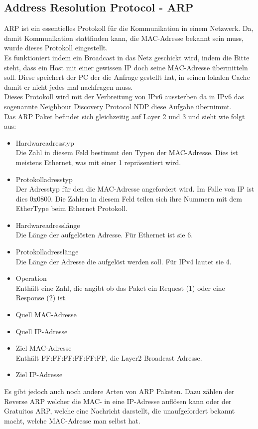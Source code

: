 \documentclass[11pt,a4paper]{report}
\begin{document}
\subsection{Address Resolution Protocol - ARP}\label{ssec:arp}
ARP ist ein essentielles Protokoll für die Kommunikation in einem Netzwerk. Da, damit Kommunikation stattfinden kann, die MAC-Adresse bekannt sein muss, wurde dieses Protokoll eingestellt.\\
Es funktioniert indem ein Broadcast in das Netz geschickt wird, indem die Bitte steht, dass ein Host mit einer gewissen IP doch seine MAC-Adresse übermitteln soll. Diese speichert der PC der die Anfrage gestellt hat, in seinen lokalen Cache damit er nicht jedes mal nachfragen muss.\\
Dieses Protokoll wird mit der Verbreitung von IPv6 aussterben da in IPv6 das sogenannte Neighbour Discovery Protocol NDP diese Aufgabe übernimmt.\\

Das ARP Paket befindet sich gleichzeitig auf Layer 2 und 3 und sieht wie folgt aus:\\
\begin{itemize}
\item Hardwareadresstyp\\
Die Zahl in diesem Feld bestimmt den Typen der MAC-Adresse. Dies ist meistens Ethernet, was mit einer 1 repräsentiert wird.
\item Protokolladresstyp\\
Der Adresstyp für den die MAC-Adresse angefordert wird. Im Falle von IP ist dies 0x0800. Die Zahlen in diesem Feld teilen sich ihre Nummern mit dem EtherType beim Ethernet Protokoll.
\item Hardwareadresslänge\\
Die Länge der aufgelösten Adresse. Für Ethernet ist sie 6.
\item Protokolladresslänge\\
Die Länge der Adresse die aufgelöst werden soll. Für IPv4 lautet sie 4.
\item Operation\\
Enthält eine Zahl, die angibt ob das Paket ein Request (1) oder eine Response (2) ist.
\item Quell MAC-Adresse
\item Quell IP-Adresse
\item Ziel MAC-Adresse\\
Enthält FF:FF:FF:FF:FF:FF, die Layer2 Broadcast Adresse.
\item Ziel IP-Adresse
\end{itemize}
Es gibt jedoch auch noch andere Arten von ARP Paketen. Dazu zählen der Reverse ARP welcher die MAC- in eine IP-Adresse auflösen kann oder der Gratuitos ARP, welche eine Nachricht darstellt, die unaufgefordert bekannt macht, welche MAC-Adresse man selbst hat.
\end{document}
